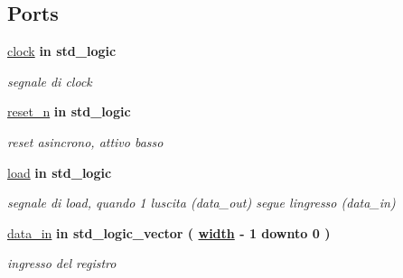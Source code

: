 \subsection*{Ports}
 \begin{DoxyCompactItemize}
\item 
\hyperlink{group___generic_buffer_gadfc2d5e995e9c6876b2e55bf6a5c4071}{clock}  {\bfseries {\bfseries \textcolor{vhdlchar}{in}\textcolor{vhdlchar}{ }}} {\bfseries \textcolor{vhdlchar}{std\+\_\+logic}\textcolor{vhdlchar}{ }} 
\begin{DoxyCompactList}\small\item\em segnale di clock \end{DoxyCompactList}\item 
\hyperlink{group___generic_buffer_ga446ea52ed8c4a84181a47d9165ce41a5}{reset\+\_\+n}  {\bfseries {\bfseries \textcolor{vhdlchar}{in}\textcolor{vhdlchar}{ }}} {\bfseries \textcolor{vhdlchar}{std\+\_\+logic}\textcolor{vhdlchar}{ }} 
\begin{DoxyCompactList}\small\item\em reset asincrono, attivo basso \end{DoxyCompactList}\item 
\hyperlink{group___generic_buffer_gaba761f7740d0b6257a0e283b3734ddbf}{load}  {\bfseries {\bfseries \textcolor{vhdlchar}{in}\textcolor{vhdlchar}{ }}} {\bfseries \textcolor{vhdlchar}{std\+\_\+logic}\textcolor{vhdlchar}{ }} 
\begin{DoxyCompactList}\small\item\em segnale di load, quando \textquotesingle{}1\textquotesingle{} l\textquotesingle{}uscita (data\+\_\+out) segue l\textquotesingle{}ingresso (data\+\_\+in) \end{DoxyCompactList}\item 
\hyperlink{group___generic_buffer_ga597910698848749da5951285c85fa4f9}{data\+\_\+in}  {\bfseries {\bfseries \textcolor{vhdlchar}{in}\textcolor{vhdlchar}{ }}} {\bfseries \textcolor{vhdlchar}{std\+\_\+logic\+\_\+vector}\textcolor{vhdlchar}{ }\textcolor{vhdlchar}{(}\textcolor{vhdlchar}{ }\textcolor{vhdlchar}{ }\textcolor{vhdlchar}{ }\textcolor{vhdlchar}{ }{\bfseries \hyperlink{group___generic_buffer_gae47d961480346c1d82439a66505e6e7d}{width}} \textcolor{vhdlchar}{-\/}\textcolor{vhdlchar}{ } \textcolor{vhdldigit}{1} \textcolor{vhdlchar}{ }\textcolor{vhdlchar}{downto}\textcolor{vhdlchar}{ }\textcolor{vhdlchar}{ } \textcolor{vhdldigit}{0} \textcolor{vhdlchar}{ }\textcolor{vhdlchar}{)}\textcolor{vhdlchar}{ }} 
\begin{DoxyCompactList}\small\item\em ingresso del registro \end{DoxyCompactList}\item 

\end{DoxyCompactItemize}
